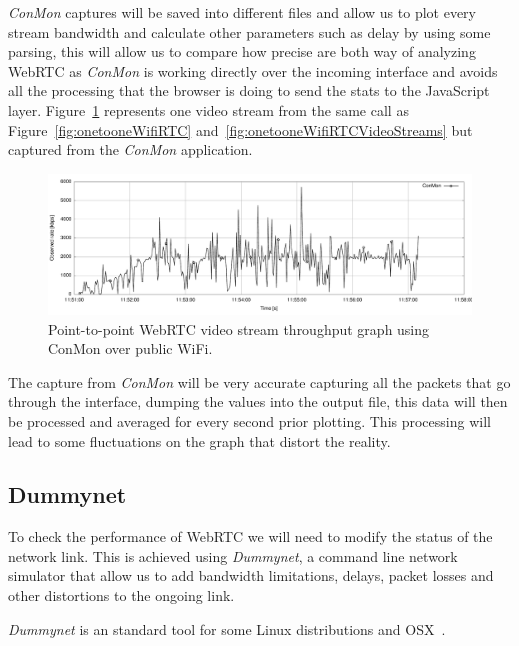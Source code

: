 {\it ConMon} captures will be saved into different files and allow us to plot every stream bandwidth and calculate other parameters such as delay by using some parsing, this will allow us to compare how precise are both way of analyzing WebRTC as {\it ConMon} is working directly over the incoming interface and avoids all the processing that the browser is doing to send the stats to the JavaScript layer. Figure~\ref{fig:onetooneWifiRTCConMon} represents one video stream from the same call as Figure~\ref{fig:onetooneWifiRTC} and~\ref{fig:onetooneWifiRTCVideoStreams} but captured from the {\it ConMon} application.

 \begin{figure}[h]
  \centering
    \includegraphics[width=1\textwidth]{./figures/onetooneWiFiConMon.pdf}
      \caption[Point-to-point WebRTC video stream throughput graph using ConMon over public WiFi]{Point-to-point WebRTC video stream throughput graph using ConMon over public WiFi.}
	\label{fig:onetooneWifiRTCConMon}
\end{figure}

The capture from {\it ConMon} will be very accurate capturing all the packets that go through the interface, dumping the values into the output file, this data will then be processed and averaged for every second prior plotting. This processing will lead to some fluctuations on the graph that distort the reality.

\subsection{Dummynet}

To check the performance of WebRTC we will need to modify the status of the network link. This is achieved using {\it Dummynet}, a command line network simulator that allow us to add bandwidth limitations, delays, packet losses and other distortions to the ongoing link.

{\it Dummynet} is an standard tool for some Linux distributions and OSX~\cite{dummynetTool}.

